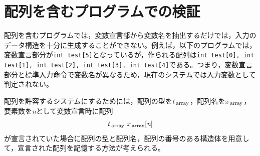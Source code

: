 \documentclass{tpu-sotu}
\begin{document}
\section{配列を含むプログラムでの検証}
配列を含むプログラムでは，変数宣言部から変数名を抽出するだけでは，入力のデータ構造を十分に生成することができない。例えば，以下のプログラムでは，変数宣言部分が{\tt int test[5]}となっているが，作られる配列は{\tt int test[0], int test[1], int test[2], int test[3], int test[4]}である。つまり，変数宣言部分と標準入力命令で変数名が異なるため，現在のシステムでは入力変数として判定されない。

配列を許容するシステムにするためには，配列の型を{\it t}$_{\rm \;array}$，配列名を{\it x}$_{\rm \;array}$，要素数を{\it n}として変数宣言時に配列
\[ 
\mbox{{\it t}$_{\rm \;array}$ {\it x}$_{\rm \;array}$[{\it n}]}
\]
が宣言されていた場合に配列の型と配列名，配列の番号のある構造体を用意して，宣言された配列を記憶する方法が考えられる。
\end{document}
